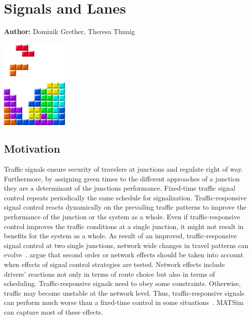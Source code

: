 \chapter{Signals and Lanes }
\label{ch:signalslanes}

\hfill \textbf{Author:} Dominik Grether, Theresa Thunig

\begin{center} \includegraphics[width=0.25\textwidth, angle=0]{figures/MATSimBook.png} \end{center}


\section{Motivation}

Traffic signals ensure security of travelers at junctions and regulate right of way. 
Furthermore, by assigning green times to the different approaches of a junction they are a determinant of the junctions performance. 
Fixed-time traffic signal control repeats periodically the same schedule for signalization. 
Traffic-responsive signal control reacts dynamically on the prevailing traffic patterns to improve the performance of the junction or the system as a whole.   
Even if traffic-responsive control improves the traffic conditions at a single junction, it might not result in benefits for the system as a whole. 
As result of an improved, traffic-responsive signal control at two single junctions, network wide changes in travel patterns can evolve~\cite{Burghout2007HybridSimulationAdaptiveSignal}. 
\citet{Hu1997D2DFlowEvolutionReactiveSignalsDynasmart} argue that
second order or network effects should be taken into account when effects of signal control strategies are tested. Network effects include drivers' reactions not only in terms of route choice but also in terms of scheduling. 
Traffic-responsive signals need to obey some constraints. 
Otherwise, traffic may become unstable at the network level. 
Thus, traffic-responsive signals can perform much worse than a fixed-time control in some situations~\citep{LaemmerHelbing2010SelfStabilizingSignalControlRealNet}. 
MATSim can capture most of these effects. 

